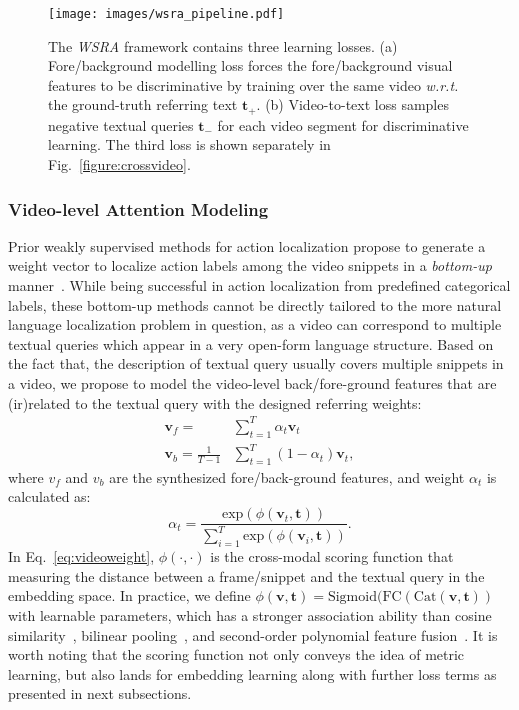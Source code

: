 \begin{figure}[t]
\centering
\texttt{[image: images/wsra\_pipeline.pdf]}
\caption[ The \textit{WSRA} framework's learning losses.]{\small The \textit{WSRA} framework contains three learning losses. (a) Fore/background modelling loss forces the fore/background visual features to be discriminative by training 
over the same video \textit{w.r.t.} the ground-truth referring text $\mathbf{t}_\textit{$+$}$. (b) Video-to-text loss samples negative textual queries $\mathbf{t}_\textit{$-$}$ for each video segment for discriminative learning. The third loss is shown separately in Fig.~\ref{figure:crossvideo}.
}
\label{figure:architecture}
\end{figure}

\subsubsection{Video-level Attention Modeling}
Prior weakly supervised methods for action localization propose to generate a weight vector to localize action labels among the video snippets in a \textit{bottom-up} manner~\citep{paul2018w,nguyen2019weakly}. While being successful in action localization from predefined categorical labels, these bottom-up methods cannot be directly tailored to the more natural language localization problem in question, as a video can correspond to multiple textual queries which appear in a very open-form language structure. Based on the fact that, the description of textual query usually covers multiple snippets in a video, we propose to model the video-level back/fore-ground features that are (ir)related to the textual query with the designed referring weights:
\begin{equation}
\begin{split}
    \boldsymbol{v}_f = &\sum^{T}_{t=1}\alpha_t\boldsymbol{v}_t \\
    \boldsymbol{v}_b = \frac{1}{T-1} &\sum^{T}_{t=1}(1-\alpha_t)\boldsymbol{v}_t,
\end{split}
\label{eq:foreback}
\end{equation}
where $v_f$ and $v_b$ are the synthesized fore/back-ground features, and weight $\alpha_t$ is calculated as:
\begin{equation}
    \alpha_t = \frac{\text{exp}(\phi(\boldsymbol{v}_t, \boldsymbol{t}))}{{\sum_{i=1}^{T}\text{exp}(\phi(\boldsymbol{v}_i, \boldsymbol{t}))}}.
    \label{eq:videoweight}
\end{equation}
In Eq.~\ref{eq:videoweight}, $\phi(\cdot, \cdot)$ is the cross-modal scoring function that measuring the distance between a frame/snippet and the textual query in the embedding space.
In practice, we define $\phi(\boldsymbol{v}, \boldsymbol{t})=\text{Sigmoid}(\text{FC}(\text{Cat}(\boldsymbol{v}, \boldsymbol{t}))$ with learnable parameters, which has a stronger association ability than cosine similarity~\citep{yu2018mattnet}, bilinear pooling~\citep{gao2016compact,fang2018modularizedtextual,kong2017low}, and second-order polynomial feature fusion~\citep{scikit-learn,gao2017tall}.
It is worth noting that the scoring function not only conveys the idea of metric learning, 
but also lands for embedding learning along with further loss terms as presented in next subsections.

